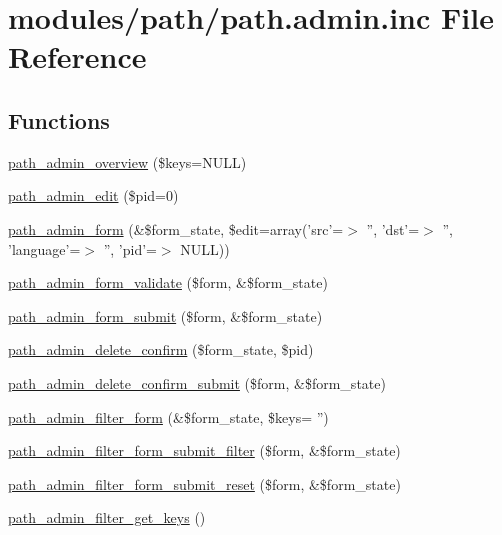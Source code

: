 \hypertarget{path_8admin_8inc}{
\section{modules/path/path.admin.inc File Reference}
\label{path_8admin_8inc}
}
\subsection*{Functions}
\begin{CompactItemize}
\item 
\hyperlink{path_8admin_8inc_08b0593e253b2d3813fc7fb9514b9142}{path\_\-admin\_\-overview} (\$keys=NULL)
\item 
\hyperlink{path_8admin_8inc_9956956a3d5f93a0462fd8bdb1ed6154}{path\_\-admin\_\-edit} (\$pid=0)
\item 
\hyperlink{group__forms_gbd04af41e3afa56ef5dd7bffdeea7459}{path\_\-admin\_\-form} (\&\$form\_\-state, \$edit=array('src'=$>$ '', 'dst'=$>$ '', 'language'=$>$ '', 'pid'=$>$ NULL))
\item 
\hyperlink{path_8admin_8inc_4251683f0b26edf9f54db68f4aa5e0b3}{path\_\-admin\_\-form\_\-validate} (\$form, \&\$form\_\-state)
\item 
\hyperlink{path_8admin_8inc_9e4a6b6f202fad04dcdb2bbcd800d168}{path\_\-admin\_\-form\_\-submit} (\$form, \&\$form\_\-state)
\item 
\hyperlink{path_8admin_8inc_52aa64c47584180398592cec25cc53d5}{path\_\-admin\_\-delete\_\-confirm} (\$form\_\-state, \$pid)
\item 
\hyperlink{path_8admin_8inc_11e17265eec5e2e31acf2c251f270e78}{path\_\-admin\_\-delete\_\-confirm\_\-submit} (\$form, \&\$form\_\-state)
\item 
\hyperlink{group__forms_g7596ad03b96a0cf739d4d33a5fb2fd71}{path\_\-admin\_\-filter\_\-form} (\&\$form\_\-state, \$keys= '')
\item 
\hyperlink{path_8admin_8inc_250d1de05853ce7562fb1b9530dba273}{path\_\-admin\_\-filter\_\-form\_\-submit\_\-filter} (\$form, \&\$form\_\-state)
\item 
\hyperlink{path_8admin_8inc_89dc681fab5e84263049933d97823291}{path\_\-admin\_\-filter\_\-form\_\-submit\_\-reset} (\$form, \&\$form\_\-state)
\item 
\hyperlink{path_8admin_8inc_191749aff70cdc1cf300221d9f641206}{path\_\-admin\_\-filter\_\-get\_\-keys} ()
\end{CompactItemize}


